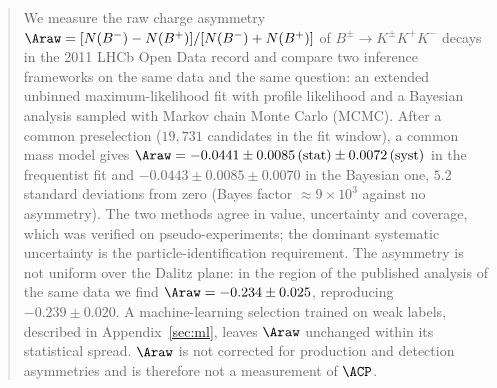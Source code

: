 \begin{abstract}
We measure the raw charge asymmetry $\Araw=[N(B^-)-N(B^+)]/[N(B^-)+N(B^+)]$ of $B^{\pm}\to K^{\pm}K^{+}K^{-}$ decays in the 2011 LHCb Open Data record and compare two inference frameworks on the same data and the same question: an extended unbinned maximum-likelihood fit with profile likelihood and a Bayesian analysis sampled with Markov chain Monte Carlo (MCMC). After a common preselection ($19{,}731$ candidates in the fit window), a common mass model gives $\Araw=-0.0441\pm0.0085\,(\text{stat})\pm0.0072\,(\text{syst})$ in the frequentist fit and $-0.0443\pm0.0085\pm0.0070$ in the Bayesian one, $5.2$ standard deviations from zero (Bayes factor $\approx9\times10^3$ against no asymmetry). The two methods agree in value, uncertainty and coverage, which was verified on pseudo-experiments; the dominant systematic uncertainty is the particle-identification requirement. The asymmetry is not uniform over the Dalitz plane: in the region of the published analysis of the same data we find $\Araw=-0.234\pm0.025$, reproducing $-0.239\pm0.020$. A machine-learning selection trained on weak labels, described in Appendix~\ref{sec:ml}, leaves $\Araw$ unchanged within its statistical spread. $\Araw$ is not corrected for production and detection asymmetries and is therefore not a measurement of $\ACP$.
\end{abstract}
